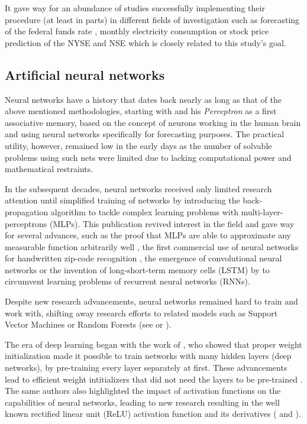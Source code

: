 It gave way for an abundance of studies successfully implementing their procedure (at least in parts) in different fields of investigation such as forecasting of the federal funds rate \citep{hein1988forecasting}, monthly electricity consumption \citep{harris1993dynamic} or stock price prediction of the NYSE and NSE \citep{ariyo2014stock} which is closely related to this study's goal.

\subsection*{Artificial neural networks}

Neural networks have a history that dates back nearly as long as that of the above mentioned methodologies, starting with \citet{rosenblatt1957perceptron} and his \textit{Perceptron} as a first associative memory, based on the concept of neurons working in the human brain and \citet{hu1964adaptive} using neural networks specifically for forecasting purposes. The practical utility, however, remained low in the early days as the number of solvable problems using such nets were limited due to lacking computational power and mathematical restraints. 

In the subsequent decades, neural networks received only limited research attention until \citet{rumelhart1985learning} simplified training of networks by introducing the back-propagation algorithm to tackle complex learning problems with multi-layer-perceptrons (MLPs). This publication revived interest in the field and gave way for several advances, such as the proof that MLPs are able to approximate any measurable function arbitrarily well \citep{hornik1989multilayer}, the first commercial use of neural networks for handwritten zip-code recognition \citep{lecun1989backpropagation}, the emergence of convolutional neural networks \citep{lecun1995convolutional} or the invention of long-short-term memory cells (LSTM) by \citet{hochreiter1997long} to circumvent learning problems of recurrent neural networks (RNNs).

Despite new research advancements, neural networks remained hard to train and work with, shifting away research efforts to related models such as Support Vector Machines or Random Forests (see \citet{boser1992training} or \citet{ho1995random}). 

The era of deep learning began with the work of \citet{hinton2006fast}, who showed that proper weight initialization made it possible to train networks with many hidden layers (deep networks), by pre-training every layer separately at first. These advancements lead to efficient weight intitializers that did not need the layers to be pre-trained \citep{glorot2010understanding}. The same authors also highlighted the impact of activation functions on the capabilities of neural networks, leading to new research resulting in the well known rectified linear unit (ReLU) activation function and its derivatives (\citet{jarrett2009best} and \citet{nair2010rectified}). 

